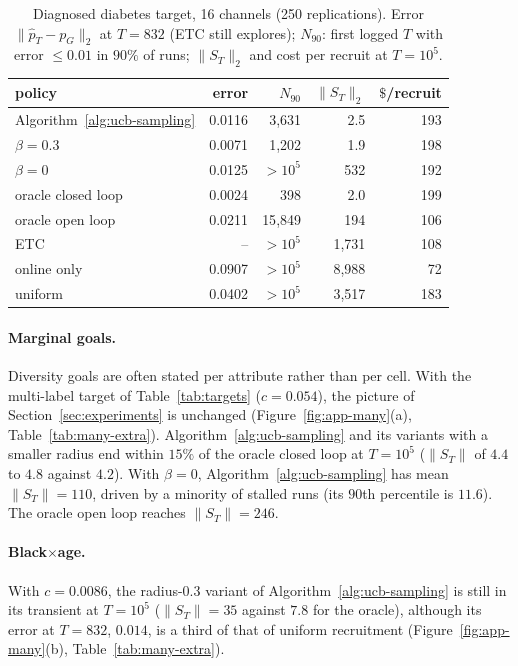 \documentclass[twoside]{article}
\begin{document}
\begin{table}[!ht]
\caption{Diagnosed diabetes target, 16 channels (250 replications). Error
\(\|\widehat p_T-p_G\|_2\) at \(T=832\) (ETC still explores); \(N_{90}\):
first logged \(T\) with error \(\le0.01\) in \(90\%\) of runs;
\(\|S_T\|_2\) and cost per recruit at \(T=10^5\).}
\label{tab:many}
\centering\small
\begin{tabular}{lrrrr}
\hline
policy & error & \(N_{90}\) & \(\|S_T\|_2\) & \(\$\)/recruit\\
\hline
Algorithm~\ref{alg:ucb-sampling} & 0.0116 & 3{,}631 & 2.5 & 193\\
\quad \(\beta=0.3\) & 0.0071 & 1{,}202 & 1.9 & 198\\
\quad \(\beta=0\) & 0.0125 & \(>10^5\) & 532 & 192\\
oracle closed loop & 0.0024 & 398 & 2.0 & 199\\
oracle open loop & 0.0211 & 15{,}849 & 194 & 106\\
ETC & -- & \(>10^5\) & 1{,}731 & 108\\
online only & 0.0907 & \(>10^5\) & 8{,}988 & 72\\
uniform & 0.0402 & \(>10^5\) & 3{,}517 & 183\\
\hline
\end{tabular}
\end{table}


\paragraph{Marginal goals.} Diversity goals are often stated per
attribute rather than per cell. With the multi-label target of
Table~\ref{tab:targets} (\(c=0.054\)), the picture of
Section~\ref{sec:experiments} is unchanged (Figure~\ref{fig:app-many}(a),
Table~\ref{tab:many-extra}). Algorithm~\ref{alg:ucb-sampling} and its
variants with a smaller radius end within \(15\%\) of the oracle closed
loop at \(T=10^5\) (\(\|S_T\|\) of \(4.4\) to \(4.8\) against \(4.2\)).
With \(\beta=0\), Algorithm~\ref{alg:ucb-sampling} has mean \(\|S_T\|=110\), driven by a minority of stalled runs
(its \(90\)th percentile is \(11.6\)). The oracle open loop reaches
\(\|S_T\|=246\).

\paragraph{Black\(\times\)age.} With \(c=0.0086\), the radius-\(0.3\)
variant of Algorithm~\ref{alg:ucb-sampling} is still in its transient at
\(T=10^5\) (\(\|S_T\|=35\) against \(7.8\) for the oracle), although its
error at \(T=832\), \(0.014\), is a third of that of uniform recruitment
(Figure~\ref{fig:app-many}(b), Table~\ref{tab:many-extra}).
\end{document}
